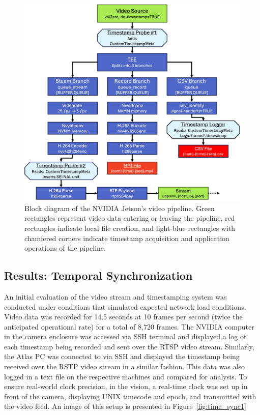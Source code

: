 \documentclass{erauthesis}
\begin{document}
\begin{figure}[htbp]
\centering
\includegraphics[width=5in]{Images/gstreamer_block.png}
\caption{Block diagram of the NVIDIA Jetson's video pipeline. Green rectangles represent video data entering or leaving the pipeline, red rectangles indicate local file creation, and light-blue rectangles with chamfered corners indicate timestamp acquisition and application operations of the pipeline.}
\label{video_pipeline}
\end{figure}

\subsection{Results: Temporal Synchronization} \label{results)time_sync_cam}



An initial evaluation of the video stream and timestamping system was conducted under conditions that simulated expected network load conditions.
Video data was recorded for 14.5 seconds at 10 frames per second (twice the anticipated operational rate) for a total of 8,720 frames. 
The NVIDIA computer in the camera enclosure was accessed via SSH terminal and displayed a log of each timestamp being recorded and sent over the RTSP video stream. Similarly, the Atlas PC was connected to via SSH and displayed the timestamp being received over the RSTP video stream in a similar fashion. This data was also logged in a text file on the respective machines and compared for analysis. 
To ensure real-world clock precision, in the vision, a real-time clock was set up in front of the camera, displaying UNIX timecode and epoch, and transmitted with the video feed. An image of this setup is presented in Figure~\ref{fig:time_sync1}
\end{document}
